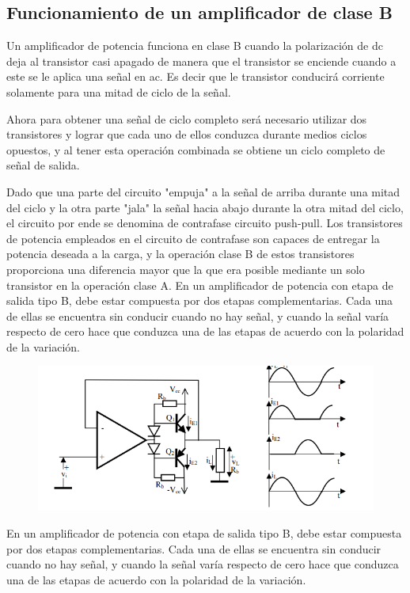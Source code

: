 \documentclass[12pt,a4paper]{article}
\begin{document}
\subsection{Funcionamiento de un amplificador de clase B}
Un amplificador de potencia funciona en clase B cuando la polarización de dc deja al transistor casi apagado de manera que el transistor se enciende cuando a este se le aplica una señal en ac. Es decir que le transistor conducirá corriente solamente para una mitad de ciclo de la señal.

Ahora para obtener una señal de ciclo completo será necesario utilizar dos transistores y lograr que cada uno de ellos conduzca durante medios ciclos opuestos, y al tener esta operación combinada se obtiene un ciclo completo de señal de salida.

Dado que una parte del circuito "empuja" a la señal de arriba durante una mitad del ciclo y la otra parte "jala" la señal hacia abajo durante la otra mitad del ciclo, el circuito por ende se denomina de contrafase circuito push-pull.
Los transistores de potencia empleados en el circuito de contrafase son capaces de entregar la potencia deseada a la carga, y la operación clase B de estos transistores proporciona una diferencia mayor que la que era posible mediante un solo transistor en la operación clase A.
\newpage
En un amplificador de potencia con etapa de salida tipo B, debe estar compuesta por dos
etapas complementarias. Cada una de ellas se encuentra sin conducir cuando no hay señal,
y cuando la señal varía respecto de cero hace que conduzca una de las etapas de acuerdo
con la polaridad de la variación. 
\begin{figure}[h!]
\centering
\includegraphics[scale=1]{Captura.PNG} 
\end{figure}
En un amplificador de potencia con etapa de salida tipo B, debe estar compuesta por dos
etapas complementarias. Cada una de ellas se encuentra sin conducir cuando no hay señal,
y cuando la señal varía respecto de cero hace que conduzca una de las etapas de acuerdo
con la polaridad de la variación.
\end{document}
